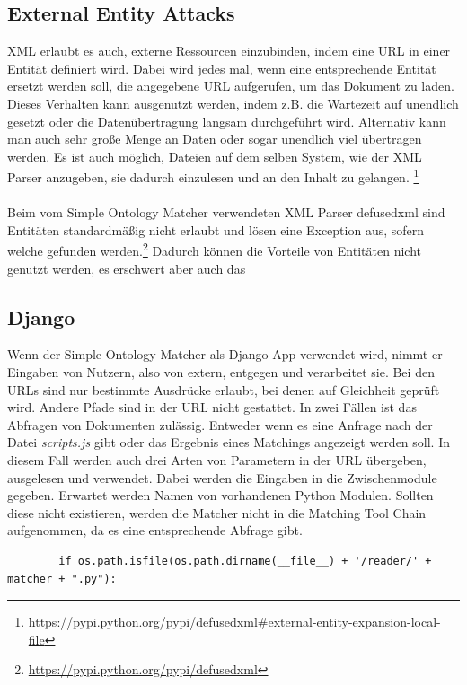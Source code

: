 		\subsection{External Entity Attacks}
		XML erlaubt es auch, externe Ressourcen einzubinden, indem eine URL in einer
		Entität definiert wird. Dabei wird jedes mal, wenn eine entsprechende Entität
		ersetzt werden soll, die angegebene URL aufgerufen, um das Dokument zu laden.
		Dieses Verhalten kann ausgenutzt werden, indem z.B. die Wartezeit auf
		unendlich gesetzt oder die Datenübertragung langsam durchgeführt wird.
		Alternativ kann man auch sehr große Menge an Daten oder sogar unendlich viel
		übertragen werden.\cite{Sul09}
		Es ist auch möglich, Dateien auf dem selben System, wie der XML Parser
		anzugeben, sie dadurch einzulesen und an den Inhalt zu gelangen.
		\footnote{\url{https://pypi.python.org/pypi/defusedxml#external-entity-expansion-local-file}}
		\\
		\\
		Beim vom Simple Ontology Matcher verwendeten XML Parser defusedxml sind
		Entitäten standardmäßig nicht erlaubt und lösen eine
		Exception aus, sofern welche gefunden werden.\footnote{\url{https://pypi.python.org/pypi/defusedxml}}
		Dadurch können die Vorteile von Entitäten nicht genutzt werden, es erschwert
		aber auch das 
		
		\subsection{Django}
		Wenn der Simple Ontology Matcher als Django App verwendet wird, nimmt er
		Eingaben von Nutzern, also von extern, entgegen und verarbeitet sie. Bei den
		URLs sind nur bestimmte Ausdrücke erlaubt, bei denen auf Gleichheit geprüft
		wird. Andere Pfade sind in der URL nicht gestattet. In zwei Fällen ist das
		Abfragen von Dokumenten zulässig.
		Entweder wenn es eine Anfrage nach der Datei \textit{scripts.js} gibt oder das Ergebnis
		eines Matchings angezeigt werden soll. In diesem Fall werden auch drei Arten
		von Parametern in der URL übergeben, ausgelesen und verwendet. Dabei werden
		die Eingaben in die Zwischenmodule gegeben. Erwartet werden Namen von
		vorhandenen Python Modulen. Sollten diese nicht existieren, werden die
		Matcher nicht in die Matching Tool Chain aufgenommen, da es eine
		entsprechende Abfrage gibt.
		\begin{lstlisting}
		if os.path.isfile(os.path.dirname(__file__) + '/reader/' + matcher + ".py"):
		\end{lstlisting}
		
